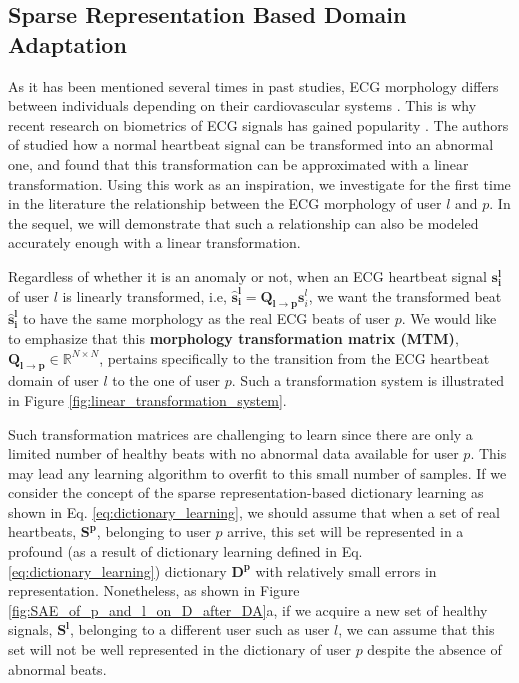 \documentclass[journal,transmag]{IEEEtran}
\begin{document}
\subsection{Sparse Representation Based Domain Adaptation}
As it has been mentioned several times in past studies, ECG morphology differs between individuals depending on their cardiovascular systems \cite{ECGDataset1}. This is why recent research on biometrics of ECG signals has gained popularity \cite{ECGBiometrics1, ECGBiometrics2}. The authors of \cite{kiranyaz2017personalized} studied how a normal heartbeat signal can be transformed into an abnormal one, and found that this transformation can be approximated with a linear transformation. Using this work as an inspiration, we investigate for the first time in the literature the relationship between the ECG morphology of user $l$ and $p$. In the sequel, we will demonstrate that such a relationship can also be modeled accurately enough with a linear transformation.

Regardless of whether it is an anomaly or not, when an ECG heartbeat signal $\bm{s_i^l}$ of user $l$ is linearly transformed, i.e, $\bm{\widehat{s}_i^l} = \bm{Q_{l \rightarrow p}} \bm{s}_i^l$, we want the transformed beat $\bm{\widehat{s}_i^l}$ to have the same morphology as the real ECG beats of user $p$. We would like to emphasize that this \textbf{morphology transformation matrix (MTM)}, $\bm{Q_{l \rightarrow p}}  \in \mathbb{R}^{N \times N}$, pertains specifically to the transition from the ECG heartbeat domain of user $l$ to the one of user $p$. Such a transformation system is illustrated in Figure \ref{fig:linear_transformation_system}.

Such transformation matrices are challenging to learn since there are only a limited number of healthy beats with no abnormal data available for user $p$. This may lead any learning algorithm to overfit to this small number of samples. If we consider the concept of the sparse representation-based dictionary learning as shown in Eq. \eqref{eq:dictionary_learning}, we should assume that when a set of real heartbeats, $\bm{S^p}$, belonging to user $p$ arrive, this set will be represented in a profound (as a result of dictionary learning defined in Eq. \eqref{eq:dictionary_learning}) dictionary $\bm{D^p}$ with relatively small errors in representation. Nonetheless, as shown in Figure \ref{fig:SAE_of_p_and_l_on_D_after_DA}a, if we acquire a new set of healthy signals, $\bm{S^l}$, belonging to a different user such as user $l$, we can assume that this set will not be well represented in the dictionary of user $p$ despite the absence of abnormal beats.
\end{document}
